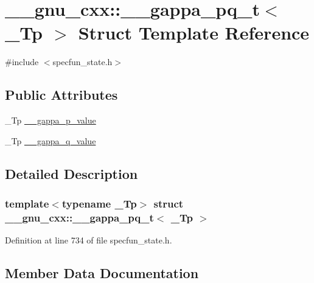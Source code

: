 \hypertarget{struct____gnu__cxx_1_1____gappa__pq__t}{}\section{\+\_\+\+\_\+gnu\+\_\+cxx\+:\+:\+\_\+\+\_\+gappa\+\_\+pq\+\_\+t$<$ \+\_\+\+Tp $>$ Struct Template Reference}
\label{struct____gnu__cxx_1_1____gappa__pq__t}


{\ttfamily \#include $<$specfun\+\_\+state.\+h$>$}

\subsection*{Public Attributes}
\begin{DoxyCompactItemize}
\item 
\+\_\+\+Tp \hyperlink{struct____gnu__cxx_1_1____gappa__pq__t_a73fcc1e1029dd11fad960b142b98f3cf}{\+\_\+\+\_\+gappa\+\_\+p\+\_\+value}
\item 
\+\_\+\+Tp \hyperlink{struct____gnu__cxx_1_1____gappa__pq__t_afd7d83a4e618ca4b710c952638951714}{\+\_\+\+\_\+gappa\+\_\+q\+\_\+value}
\end{DoxyCompactItemize}


\subsection{Detailed Description}
\subsubsection*{template$<$typename \+\_\+\+Tp$>$\newline
struct \+\_\+\+\_\+gnu\+\_\+cxx\+::\+\_\+\+\_\+gappa\+\_\+pq\+\_\+t$<$ \+\_\+\+Tp $>$}



Definition at line 734 of file specfun\+\_\+state.\+h.



\subsection{Member Data Documentation}
\mbox{\label{struct____gnu__cxx_1_1____gappa__pq__t_a73fcc1e1029dd11fad960b142b98f3cf}} 
